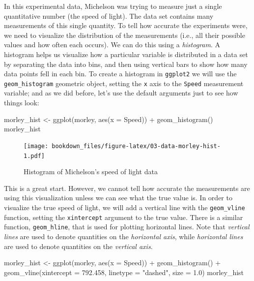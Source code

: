 \documentclass[
]{krantz}
\makeatletter
\newenvironment{Shaded}{\begin{snugshade}}{\end{snugshade}}
\newcommand{\AttributeTok}[1]{\textcolor[rgb]{0.61,0.61,0.61}{#1}}
\newcommand{\FloatTok}[1]{\textcolor[rgb]{0.06,0.06,0.06}{#1}}
\newcommand{\FunctionTok}[1]{\textcolor[rgb]{0,0,0}{#1}}
\newcommand{\NormalTok}[1]{#1}
\newcommand{\OtherTok}[1]{\textcolor[rgb]{0.37,0.37,0.37}{#1}}
\newcommand{\SpecialCharTok}[1]{\textcolor[rgb]{0,0,0}{#1}}
\newcommand{\StringTok}[1]{\textcolor[rgb]{0.5,0.5,0.5}{#1}}
\newenvironment{kframe}{%
\medskip{}
\setlength{\fboxsep}{.8em}
 \def\at@end@of@kframe{}%
 \ifinner\ifhmode%
  \def\at@end@of@kframe{\end{minipage}}%
  \begin{minipage}{\columnwidth}%
 \fi\fi%
 \def\FrameCommand##1{\hskip\@totalleftmargin \hskip-\fboxsep
 \colorbox{shadecolor}{##1}\hskip-\fboxsep
     \hskip-\linewidth \hskip-\@totalleftmargin \hskip\columnwidth}%
 \MakeFramed {\advance\hsize-\width
   \@totalleftmargin\z@ \linewidth\hsize
   \@setminipage}}%
 {\par\unskip\endMakeFramed%
 \at@end@of@kframe}
\renewenvironment{Shaded}{\begin{kframe}}{\end{kframe}}
\makeatother
\begin{document}
In this experimental data, Michelson was trying to measure just a single quantitative number (the speed of light). The data set
contains many measurements of this single quantity. To tell how accurate the experiments were, we need to visualize the
distribution of the measurements (i.e., all their possible values and how often each occurs). We can do this using a \emph{histogram}. A histogram helps us visualize how a
particular variable is distributed in a data set by separating the data into bins, and then using vertical bars
to show how many data points fell in each bin. To create a histogram in \texttt{ggplot2} we will use the \texttt{geom\_histogram} geometric
object, setting the \texttt{x} axis to the \texttt{Speed} measurement variable; and as we did before, let's use the default arguments just to see how things look:

\begin{Shaded}
\begin{Highlighting}[]
\NormalTok{morley\_hist }\OtherTok{\textless{}{-}} \FunctionTok{ggplot}\NormalTok{(morley, }\FunctionTok{aes}\NormalTok{(}\AttributeTok{x =}\NormalTok{ Speed)) }\SpecialCharTok{+}
  \FunctionTok{geom\_histogram}\NormalTok{()}
\NormalTok{morley\_hist}
\end{Highlighting}
\end{Shaded}

\begin{figure}
\centering
\texttt{[image: bookdown\_files/figure-latex/03-data-morley-hist-1.pdf]}
\caption{\label{fig:03-data-morley-hist}Histogram of Michelson's speed of light data}
\end{figure}

This is a great start. However, we cannot tell how accurate the measurements are using this visualization unless we can see what the true value is.
In order to visualize the true speed of light, we will add a vertical line with the \texttt{geom\_vline} function, setting the \texttt{xintercept} argument
to the true value. There is a similar function, \texttt{geom\_hline}, that is used for plotting horizontal lines. Note that \emph{vertical lines}
are used to denote quantities on the \emph{horizontal axis}, while \emph{horizontal lines} are used to denote quantities on the \emph{vertical axis}.

\begin{Shaded}
\begin{Highlighting}[]
\NormalTok{morley\_hist }\OtherTok{\textless{}{-}} \FunctionTok{ggplot}\NormalTok{(morley, }\FunctionTok{aes}\NormalTok{(}\AttributeTok{x =}\NormalTok{ Speed)) }\SpecialCharTok{+}
  \FunctionTok{geom\_histogram}\NormalTok{() }\SpecialCharTok{+}
  \FunctionTok{geom\_vline}\NormalTok{(}\AttributeTok{xintercept =} \FloatTok{792.458}\NormalTok{, }\AttributeTok{linetype =} \StringTok{"dashed"}\NormalTok{, }\AttributeTok{size =} \FloatTok{1.0}\NormalTok{)}
\NormalTok{morley\_hist}
\end{Highlighting}
\end{Shaded}
\end{document}
